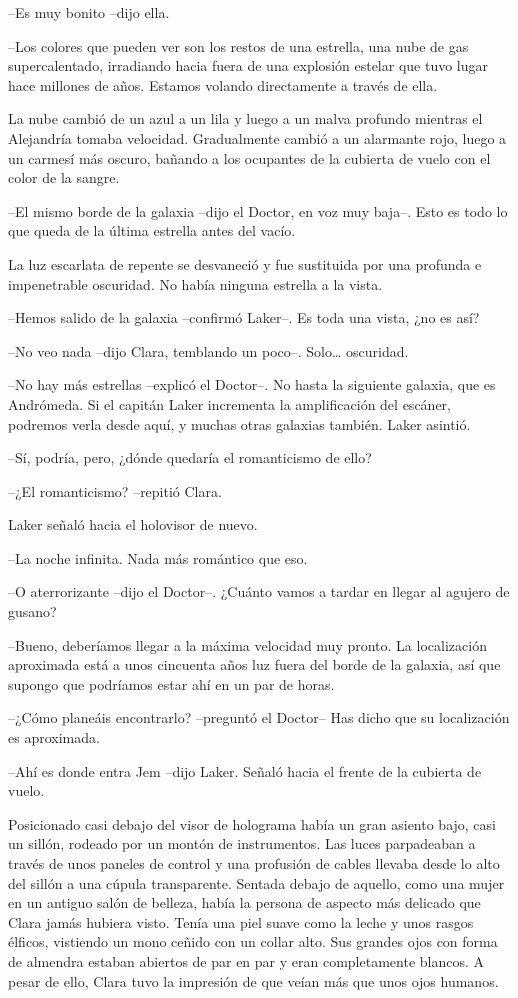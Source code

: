 {--Es muy bonito --dijo ella.}

{--Los colores que pueden ver son los restos de una estrella, una nube de
 gas supercalentado, irradiando hacia fuera de una explosión estelar que
 tuvo lugar hace millones de años. Estamos volando directamente a través
de ella.}

{La nube cambió de un azul a un lila y luego a un malva profundo mientras
 el Alejandría tomaba velocidad. Gradualmente cambió a un alarmante rojo,
 luego a un carmesí más oscuro, bañando a los ocupantes de la cubierta de
vuelo con el color de la sangre.}

{--El mismo borde de la galaxia --dijo el Doctor, en voz muy baja--. Esto
es todo lo que queda de la última estrella antes del vacío.}

{La luz escarlata de repente se desvaneció y fue sustituida por una
 profunda e impenetrable oscuridad. No había ninguna estrella a la
vista.}

{--Hemos salido de la galaxia --confirmó Laker--. Es toda una vista, ¿no
es así?}

{--No veo nada --dijo Clara, temblando un poco--. Solo\ldots{}
oscuridad.}

{--No hay más estrellas --explicó el Doctor--. No hasta la siguiente
 galaxia, que es Andrómeda. Si el capitán Laker incrementa la
 amplificación del escáner, podremos verla desde aquí, y muchas otras
galaxias también. Laker asintió.}

{--Sí, podría, pero, ¿dónde quedaría el romanticismo de ello?}

{--¿El romanticismo? --repitió Clara.}

{Laker señaló hacia el holovisor de nuevo.}

{--La noche infinita. Nada más romántico que eso.}

{--O aterrorizante --dijo el Doctor--. ¿Cuánto vamos a tardar en llegar
al agujero de gusano?}

{--Bueno, deberíamos llegar a la máxima velocidad muy pronto. La
 localización aproximada está a unos cincuenta años luz fuera del borde
 de la galaxia, así que supongo que podríamos estar ahí en un par de
horas.}

{--¿Cómo planeáis encontrarlo? --preguntó el Doctor-- Has dicho que su
localización es aproximada.}

{--Ahí es donde entra Jem --dijo Laker. Señaló hacia el frente de la
cubierta de vuelo.}

{Posicionado casi debajo del visor de holograma había un gran asiento
 bajo, casi un sillón, rodeado por un montón de instrumentos. Las luces
 parpadeaban a través de unos paneles de control y una profusión de
 cables llevaba desde lo alto del sillón a una cúpula transparente.
 Sentada debajo de aquello, como una mujer en un antiguo salón de
 belleza, había la persona de aspecto más delicado que Clara jamás
 hubiera visto. Tenía una piel suave como la leche y unos rasgos élficos,
 vistiendo un mono ceñido con un collar alto. Sus grandes ojos con forma
 de almendra estaban abiertos de par en par y eran completamente blancos.
 A pesar de ello, Clara tuvo la impresión de que veían más que unos ojos
humanos.}

